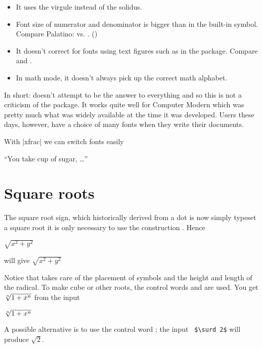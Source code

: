  \begin{itemize}
  \item It uses the virgule instead of the solidus.
  \item Font size of numerator and denominator is bigger than in the
    built-in symbol. Compare Palatino: 
    vs. . ()

  \item It doesn't correct for fonts using text figures such as in the
     package. Compare  and
    .
  \item In math mode, it doesn't always pick up the correct math
    alphabet.
 \end{itemize}
 In short:  doesn't attempt to be the answer to
 everything and so this is not a criticism of the package. It works
 quite well for Computer Modern which was pretty much what was widely
 available at the time it was developed. Users these days, however,
 have a choice of many fonts when they write their documents.

With |xfrac| we can switch fonts easily

 ``You take  cup of sugar, \ldots''




\section{Square roots}

The square root sign, which historically derived from a dot is now simply typeset a square root it is only necessary to use the construction . Hence

\begin{teX}
$\sqrt{x^2+y^2}$
\end{teX}

will give $\sqrt{x^2+y^2}$


Notice that \tex takes care of the placement of
symbols and the height and length of the radical. To make cube or other roots, the control
words  and  are used. You get $\root n \of {1+x^n}$ from the input 

\begin{teX}
   $\root n \of  {1+x^n}$ 
\end{teX}

A possible alternative is to use the control word ; the input \verb+ $\surd 2$+ will
produce $\surd 2$.

